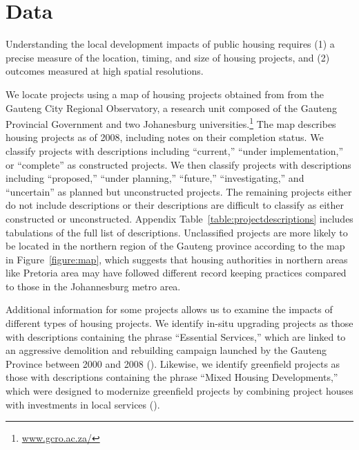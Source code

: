 \documentclass[12pt]{article}
\begin{document}
\section{Data}\label{section:data}


Understanding the local development impacts of public housing requires (1) a precise measure of the location, timing, and size of housing projects, and (2) outcomes measured at high spatial resolutions.

We locate projects using a map of housing projects obtained from from the Gauteng City Regional Observatory, a research unit composed of the Gauteng Provincial Government and two Johanesburg universities.\footnote{\href{url}{www.gcro.ac.za/}} The map describes housing projects as of 2008, including notes on their completion status.  We classify projects with descriptions including ``current,'' ``under implementation,'' or ``complete'' as constructed projects.  We then classify projects with descriptions including ``proposed,'' ``under planning,'' ``future,'' ``investigating,'' and ``uncertain'' as planned but unconstructed projects.  The remaining projects either do not include descriptions or their descriptions are difficult to classify as either constructed or unconstructed.  Appendix Table~\ref{table:projectdescriptions} includes tabulations of the full list of descriptions.  Unclassified projects are more likely to be located in the northern region of the Gauteng province according to the map in Figure~\ref{figure:map}, which suggests that housing authorities in northern areas like Pretoria area may have followed different record keeping practices compared to those in the Johannesburg metro area.  

Additional information for some projects allows us to examine the impacts of different types of housing projects.  We identify in-situ upgrading projects as those with descriptions containing the phrase ``Essential Services,'' which are linked to an aggressive demolition and rebuilding campaign launched by the Gauteng Province between 2000 and 2008 (\cite{hofmeyr2008risk}).  Likewise, we identify greenfield projects as those with descriptions containing the phrase ``Mixed Housing Developments,'' which were designed to modernize greenfield projects by combining project houses with investments in local services (\cite{greenfield}).
\end{document}
